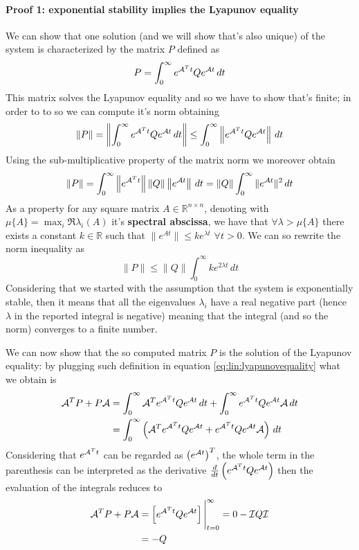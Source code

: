 		\paragraph{Proof 1: exponential stability implies the Lyapunov equality} We can show that one solution (and we will show that's also unique) of the system is characterized by the matrix $P$ defined as
		\[ P = \int_0^\infty e^{\mathcal{A}^T t} Q e^{\mathcal{A} t}\, dt \]
		This matrix solves the Lyapunov equality and so we have to show that's finite; in order to to so we can compute it's norm obtaining
		\[ \|P\| = \left\| \int_0^\infty e^{\mathcal{A}^T t} Q e^{\mathcal{A} t}\, dt \right\| \leq \int_0^\infty \left\| e^{\mathcal{A}^T t} Q e^{\mathcal{A} t} \right\|\, dt \]
		Using the sub-multiplicative property of the matrix norm we moreover obtain
		\[ \|P\| = \int_0^\infty \left\| e^{\mathcal{A}^T t} \right\| \|Q\| \left\| e^{\mathcal{A} t}\right\|\, dt = \|Q\|\int_0^\infty \|e^{\mathcal{A} t}\|^2\, dt \]
		As a property for any square matrix $A\in \mathds R^{n\times n}$, denoting with $\mu\{A\} = \max_i \Re{\lambda_i(A)}$ it's \textbf{spectral abscissa}, we have that $\forall \lambda > \mu\{A\}$ there exists a constant $k\in \mathds R$ such that $\|e^{At}\| \leq k e^{\lambda t}$ $\forall t>0$. We can so rewrite the norm inequality as
		\[ \|P\| \leq \|Q\| \int_0^\infty k e^{2\lambda t}\, dt \]
		Considering that we started with the assumption that the system is exponentially stable, then it means that all the eigenvalues $\lambda_i$ have a real negative part (hence $\lambda$ in the reported integral is negative) meaning that the integral (and so the norm) converges to a finite number.
		
		We can now show that the so computed matrix $P$ is the solution of the Lyapunov equality: by plugging such definition in equation \ref{eq:lin:lyapunovequality} what we obtain is
		\begin{align*}
			\mathcal{A}^T P + P \mathcal{A} & = \int_0^\infty \mathcal{A}^T e^{\mathcal{A}^T t} Q e^{\mathcal{A} t}\, dt + \int_0^\infty e^{\mathcal{A}^T t} Q e^{\mathcal{A} t} \mathcal{A} \, dt \\
			& = \int_0^\infty \left( \mathcal{A}^T e^{\mathcal{A}^T t} Q e^{\mathcal{A} t} + e^{\mathcal{A}^T t} Q e^{\mathcal{A} t} \mathcal{A} \right)\, dt
		\end{align*}
		Considering that $e^{\mathcal{A}^T t}$ can be regarded as $\left(e^{\mathcal{A} t} \right)^T$, the whole term in the parenthesis can be interpreted as the derivative $\frac d{dt} \left( e^{\mathcal{A}^Tt} Q e^{\mathcal{A} t}\right)$ then the evaluation of the integrals reduces to
		\begin{align*}
			\mathcal{A}^T P + P\mathcal{A} & = \left[  e^{\mathcal{A}^Tt} Q e^{\mathcal{A} t} \right] \Bigg|_{t=0}^\infty = 0 - \mathcal{I} Q \mathcal{I} \\
			& = -Q
		\end{align*}
	
